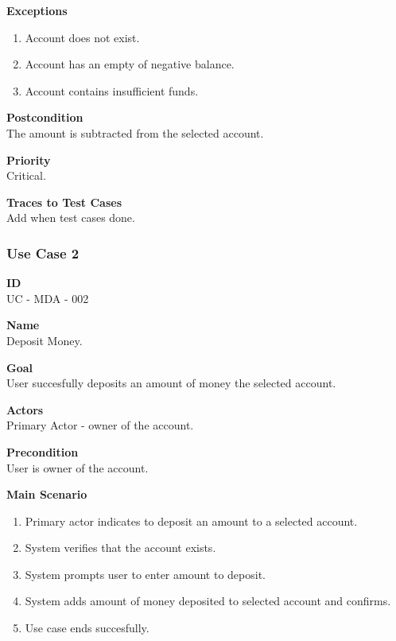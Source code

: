 \documentclass[12pt]{article}
\begin{document}
\noindent
    {\bf Exceptions}\\
    \vspace*{-0.2in}
\begin{enumerate}
    \item Account does not exist.
    \item Account has an empty of negative balance.
    \item Account contains insufficient funds.
\end{enumerate}
    

\noindent
{\bf Postcondition}\\
The amount is subtracted from the selected account.

\noindent
{\bf Priority}\\
Critical.   

\noindent
{\bf Traces to Test Cases}\\
Add when test cases done.

\subsubsection{Use Case 2} \label{uc:2}

\noindent
    {\bf ID}\\
    UC - MDA - 002

\noindent
{\bf Name}\\
Deposit Money.

\noindent
{\bf Goal}\\
User succesfully deposits an amount of money the selected account.

\noindent
{\bf Actors}\\
Primary Actor - owner of the account.

\noindent
{\bf Precondition}\\
User is owner of the account.

\noindent
{\bf Main Scenario}\\
\vspace*{-0.2in}
\begin{enumerate}
\item Primary actor indicates to deposit an amount to a selected account.
\item System verifies that the account exists.
\item System prompts user to enter amount to deposit.
\item System adds amount of money deposited to selected account and confirms.
\item Use case ends succesfully.
\end{enumerate}
\end{document}
